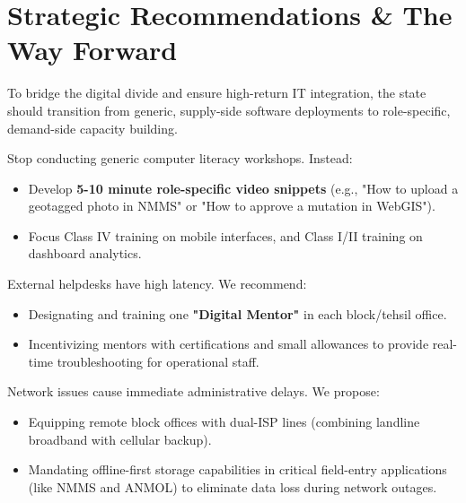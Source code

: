 \documentclass[11pt,a4paper]{article}
\begin{document}
\newpage

\section{Strategic Recommendations \& The Way Forward}

To bridge the digital divide and ensure high-return IT integration, the state should transition from generic, supply-side software deployments to role-specific, demand-side capacity building.

\begin{tcolorbox}[colback=accentteal!3,colframe=accentteal,leftrule=4pt,arc=4pt,title=\textbf{1. Shift to Role-Based Microlearning (Mission Karmayogi Model)}]
  Stop conducting generic computer literacy workshops. Instead:
  \begin{itemize}
    \item Develop \textbf{5-10 minute role-specific video snippets} (e.g., "How to upload a geotagged photo in NMMS" or "How to approve a mutation in WebGIS").
    \item Focus Class IV training on mobile interfaces, and Class I/II training on dashboard analytics.
  \end{itemize}
\end{tcolorbox}

\begin{tcolorbox}[colback=navyblue!3,colframe=navyblue,leftrule=4pt,arc=4pt,title=\textbf{2. Decentralize and Incentivize Peer Support}]
  External helpdesks have high latency. We recommend:
  \begin{itemize}
    \item Designating and training one \textbf{"Digital Mentor"} in each block/tehsil office.
    \item Incentivizing mentors with certifications and small allowances to provide real-time troubleshooting for operational staff.
  \end{itemize}
\end{tcolorbox}

\begin{tcolorbox}[colback=gold!4,colframe=gold,leftrule=4pt,arc=4pt,title=\textbf{3. Hardening local Connectivity}]
  Network issues cause immediate administrative delays. We propose:
  \begin{itemize}
    \item Equipping remote block offices with dual-ISP lines (combining landline broadband with cellular backup).
    \item Mandating offline-first storage capabilities in critical field-entry applications (like NMMS and ANMOL) to eliminate data loss during network outages.
  \end{itemize}
\end{tcolorbox}
\end{document}
